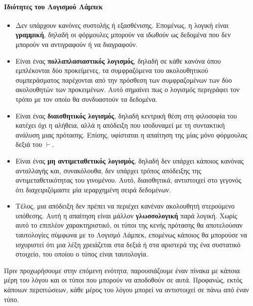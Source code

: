 \documentclass [a4paper,11pt] {book}
\theoremstyle{definition}
\theoremstyle{definition}
\begin{document}
\paragraph{Ιδιότητες του Λογισμού Λάμπεκ}
\label{propertiesOfL}
\begin{itemize}
\item Δεν υπάρχουν κανόνες συστολής ή εξασθένισης. Επομένως, η λογική είναι \textbf{γραμμική}, δηλαδή οι φόρμουλες μπορούν να ιδωθούν ως δεδομένα που δεν μπορούν να αντιγραφούν ή να διαγραφούν.
\item Είναι ένας \textbf{πολλαπλασιαστικός λογισμός}, δηλαδή σε κάθε κανόνα όπου εμπλέκονται δύο προκείμενες, τα συμφραζόμενα του ακολουθητικού συμπεράσματος παρέχονται από την πρόσθεση των συμφραζομένων των δύο ακολουθητών των προκειμένων. Αυτό σημαίνει πως ο λογισμός περιγράφει τον τρόπο με τον οποίο θα συνδυαστούν τα δεδομένα.
\item Είναι ένας \textbf{διαισθητικός λογισμός}, δηλαδή κεντρική θέση στη φιλοσοφία του κατέχει όχι η αλήθεια, αλλά η απόδειξη που ισοδυναμεί με τη συντακτική ανάλυση μιας πρότασης. Επίσης, υφίσταται η απαίτηση της μίας μόνο φόρμουλας δεξιά του $\vdash$.
\item Είναι ένας \textbf{μη αντιμεταθετικός λογισμός}, δηλαδή δεν υπάρχει κάποιος κανόνας ανταλλαγής και, συνακόλουθα, δεν υπάρχει τρόπος απόδειξης της αντιμεταθετικότητας του γινομένου. Αυτό, διαισθητικά, αντιστοιχεί στο γεγονός ότι διαχειριζόμαστε μία ιεραρχημένη σειρά δεδομένων.
\item Τέλος, μια απόδειξη δεν πρέπει να περιέχει κανέναν ακολουθητή στερούμενο υπόθεσης. Αυτή η απαίτηση είναι μάλλον \textbf{γλωσσολογική} παρά λογική. Χωρίς αυτό το επιπλέον χαρακτηριστικό, οι τύποι της κενής πρότασης θα αποτελούσαν ταυτολογίες σύμφωνα με το Λογισμό Λάμπεκ, επομένως κάποιος θα μπορούσε να ισχυριστεί ότι μια λέξη χρειάζεται στα δεξιά ή στα αριστερά της ένα συστατικό στοιχείο, του οποίου ο τύπος είναι ταυτολογία.
\end{itemize}
Πριν προχωρήσουμε στην επόμενη ενότητα, παρουσιάζουμε έναν πίνακα με κάποια μέρη του λόγου και οι τύποι που μπορούν να αποδοθούν σε αυτά. Προφανώς, εκτός κάποιων περιπτώσεων, κάθε μέρος του λόγου μπορεί να αντιστοιχεί σε πάνω από έναν τύπο.
\end{document}
